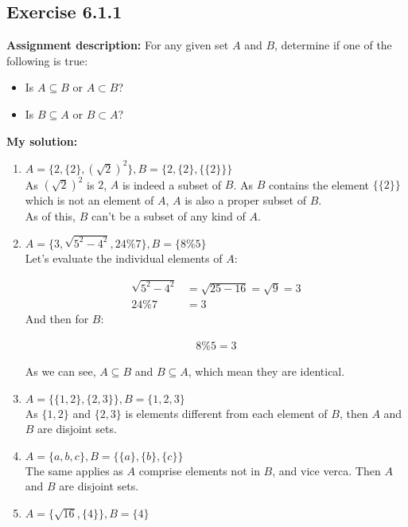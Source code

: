 \documentclass{report}
\newcommand{\mAlign}[1]{\begin{align*}#1\end{align*}}
\newcommand{\Assign}{\textbf{Assignment description: }}
\newcommand{\solution}{\textbf{My solution: }}
\newcommand{\Exercise}[1]{\subsection{Exercise #1}}
\begin{document}
	\Exercise{6.1.1}
	
	\Assign
	For any given set $A$ and $B$, determine if one of the following is true:
	\begin{itemize}
		\item Is $A \subseteq B $ or $A \subset B$?
		\item Is $B \subseteq A$ or $B \subset A$?
	\end{itemize}

	\solution
	
	\begin{enumerate}[label = \textbf{a.}]
		\item $A = \{2,\{2\},(\sqrt{2})^2\}, B = \{2,\{2\},\{\{2\}\}\}$\\
		
		As $(\sqrt{2})^2$ is $2$, $A$ is indeed a subset of $B$. As $B$ contains the element $\{\{2\}\}$ which is not an element of $A$, $A$ is also a proper subset of $B$.\\
		
		As of this, $B$ can't be a subset of any kind of $A$.
		
		\item $A = \{3, \sqrt{5^2 - 4^2}, 24 \%  7\}, B = \{8 \% 5\}$\\
		
		Let's evaluate the individual elements of $A$:
		
		\mAlign{\sqrt{5^2 - 4^2} &= \sqrt{25 - 16} = \sqrt{9} = 3\\
						24\%7 &= 3}
		And then for $B$:
		
		\mAlign{8 \% 5 = 3}
		
		As we can see, $A\subseteq B$ and $B \subseteq A$, which mean they are identical.
		
		\item $A = \{\{1,2\},\{2,3\}\}, B = \{1,2,3\}$\\
		
		As $\{1,2\}$ and $\{2,3\}$ is elements different from each element of $B$, then $A$ and $B$ are disjoint sets.
		
		\item $A = \{a,b,c\}, B = \{\{a\},\{b\},\{c\}\}$\\
		
		The same applies as $A$ comprise elements not in $B$, and vice verca. Then $A$ and $B$ are disjoint sets.
		
		\item  $A = \{\sqrt{16},\{4\}\}, B = \{4\}$\\
		

\end{enumerate}
\end{document}
